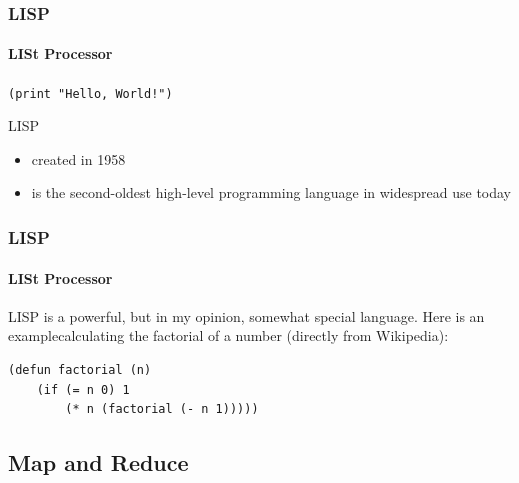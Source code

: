 \documentclass[aspectratio=169,usenames,dvipsnames]{beamer}
\begin{document}
    \begin{frame}
        \frametitle{LISP}
        \framesubtitle{LISt Processor}
            \begin{center}\texttt{(print "Hello, World!")}\end{center}
        \begin{block}{LISP}
            \begin{itemize}
                \item created in 1958
                \item is the second-oldest high-level programming language in widespread use today
            \end{itemize}
        \end{block}

    \end{frame}
    \begin{frame}[fragile]
        \frametitle{LISP}
        \framesubtitle{LISt Processor}
\begin{minipage}{0.42\textwidth}
\raggedright
LISP is a powerful, but in my opinion, somewhat special language. Here is an example\footnotemark calculating the factorial of a number {\small (directly from Wikipedia)}:
\begin{lstlisting}
(defun factorial (n)
    (if (= n 0) 1
        (* n (factorial (- n 1)))))
\end{lstlisting}
\end{minipage}
\hfill
{}
    \end{frame}

    \subsection{Map and Reduce}
\end{document}
